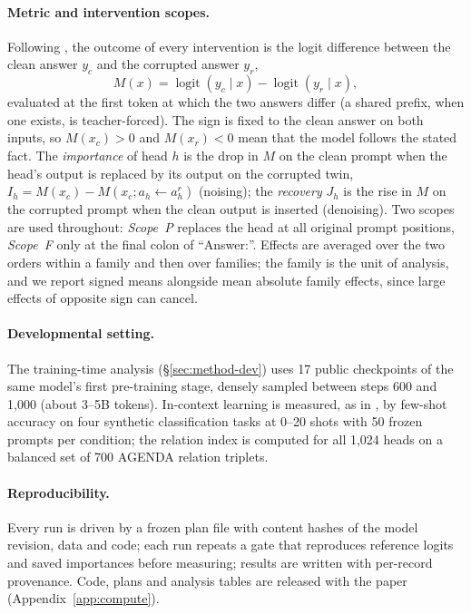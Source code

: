 \paragraph{Metric and intervention scopes.}
Following \citet{zhang2024bestpractices}, the outcome of every intervention is the
logit difference between the clean answer $y_c$ and the corrupted answer $y_r$,
\begin{equation}
\label{eq:metric}
M(x)=\operatorname{logit}(y_c\mid x)-\operatorname{logit}(y_r\mid x),
\end{equation}
evaluated at the first token at which the two answers differ (a shared prefix, when
one exists, is teacher-forced). The sign is fixed to the clean answer on both inputs,
so $M(x_c)>0$ and $M(x_r)<0$ mean that the model follows the stated fact. The
\emph{importance} of head $h$ is the drop in $M$ on the clean prompt when the head's
output is replaced by its output on the corrupted twin, $I_h=M(x_c)-M(x_c;a_h
\leftarrow a^r_h)$ (noising); the \emph{recovery} $J_h$ is the rise in $M$ on the
corrupted prompt when the clean output is inserted (denoising). Two scopes are used
throughout: \emph{Scope~P} replaces the head at all original prompt positions,
\emph{Scope~F} only at the final colon of ``Answer:''. Effects are averaged over the
two orders within a family and then over families; the family is the unit of
analysis, and we report signed means alongside mean absolute family effects, since
large effects of opposite sign can cancel.

\paragraph{Developmental setting.}
The training-time analysis (\S\ref{sec:method-dev}) uses 17 public checkpoints of
the same model's first pre-training stage, densely sampled between steps 600 and
1{,}000 (about 3--5B tokens). In-context learning is measured, as in
\citet{ren2024semantic}, by few-shot accuracy on four synthetic classification tasks
at 0--20 shots with 50 frozen prompts per condition; the relation index is computed
for all 1,024 heads on a balanced set of 700 AGENDA relation triplets.

\paragraph{Reproducibility.}
Every run is driven by a frozen plan file with content hashes of the model
revision, data and code; each run repeats a gate that reproduces reference logits and
saved importances before measuring; results are written with per-record provenance.
Code, plans and analysis tables are released with the paper
(Appendix~\ref{app:compute}).
